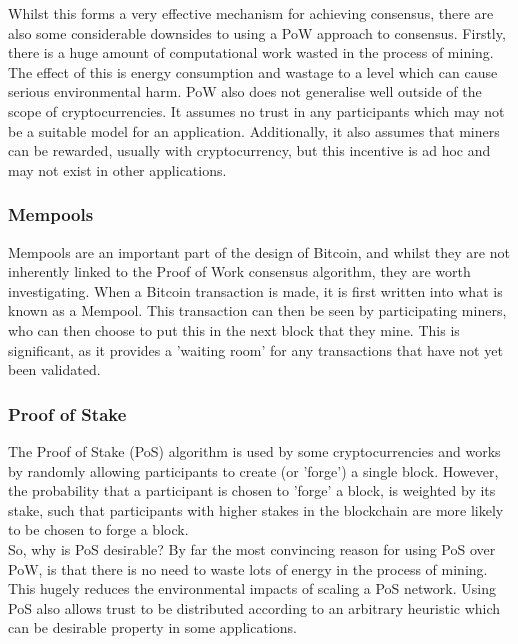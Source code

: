 \documentclass[12pt,a4paper,twoside,openright]{report}
\begin{document}
			Whilst this forms a very effective mechanism for achieving consensus, there are also some considerable downsides to using a PoW approach to consensus. 
			Firstly, there is a huge amount of computational work wasted in the process of mining. 
			The effect of this is energy consumption \cite{BitcoinEnergy} and wastage to a level which can cause serious environmental harm.
			PoW also does not generalise well outside of the scope of cryptocurrencies.
			It assumes no trust in any participants which may not be a suitable model for an application. 
			Additionally, it also assumes that miners can be rewarded, usually with cryptocurrency, but this incentive is ad hoc and may not exist in other applications.
			
			\subsubsection*{Mempools}
			Mempools are an important part of the design of Bitcoin, and whilst they are not inherently linked to the Proof of Work consensus algorithm, they are worth investigating. 
			When a Bitcoin transaction is made, it is first written into what is known as a Mempool. 
			This transaction can then be seen by participating miners, who can then choose to put this in the next block that they mine. 
			This is significant, as it provides a 'waiting room' for any transactions that have not yet been validated.  

			\subsubsection*{Proof of Stake}
			The Proof of Stake (PoS) algorithm is used by some cryptocurrencies and works by randomly allowing participants to create (or 'forge') a single block.
			However, the probability that a participant is chosen to 'forge' a block, is weighted by its stake, such that participants with higher stakes in the blockchain are more likely to be chosen to forge a block.\\

			So, why is PoS desirable? 
			By far the most convincing reason for using PoS over PoW, is that there is no need to waste lots of energy in the process of mining. 
			This hugely reduces the environmental impacts of scaling a PoS network.
			Using PoS also allows trust to be distributed according to an arbitrary heuristic which can be desirable property in some applications.\\
\end{document}
